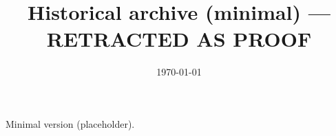 \documentclass[11pt,a4paper]{article}
\title{Historical archive (minimal) --- RETRACTED AS PROOF}\author{\InterIAauthors}\date{\today}
\begin{document}

\maketitle
Minimal version (placeholder).
\end{document}
